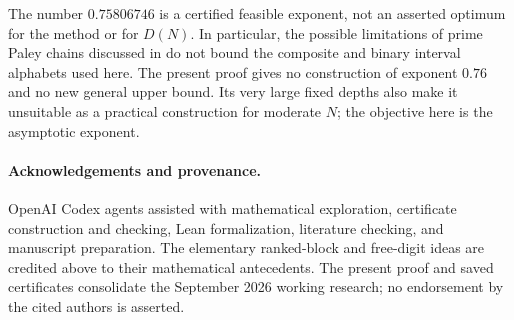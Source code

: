 \documentclass[11pt]{article}
\theoremstyle{definition}
\theoremstyle{remark}
\begin{document}
The number $0.75806746$ is a certified feasible exponent, not an asserted
optimum for the method or for $D(N)$. In particular, the possible limitations
of prime Paley chains discussed in \cite{Krachun2026,Satake2021} do not
bound the composite and binary interval alphabets used here. The present
proof gives no construction of exponent $0.76$ and no new general upper
bound. Its very large fixed depths also make it unsuitable as a practical
construction for moderate $N$; the objective here is the asymptotic exponent.

\paragraph{Acknowledgements and provenance.}
OpenAI Codex agents assisted with mathematical exploration, certificate
construction and checking, Lean formalization, literature checking, and
manuscript preparation. The elementary ranked-block and free-digit ideas
are credited above to their mathematical antecedents. The present proof
and saved certificates consolidate the September 2026 working research;
no endorsement by the cited authors is asserted.

\appendix
\end{document}
